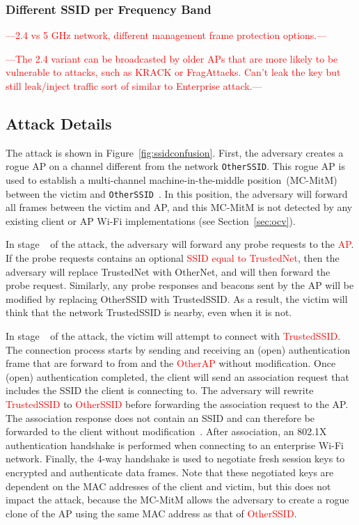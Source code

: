 \documentclass[sigconf,review,anonymous]{acmart}
\newcommand{\circlenum}[1]{\textcircled{\raisebox{-0.90pt}{#1}}}
\newcommand{\wifi}{\mbox{Wi-Fi}}
\newcommand{\fourway}{\mbox{4-way}}
\DeclareRobustCommand{\red}[1]{\textcolor{red}{#1}}
\begin{document}
\subsubsection{Different SSID per Frequency Band}

\red{---2.4 vs 5 GHz network, different management frame protection options.---}

\red{---The 2.4 variant can be broadcasted by older APs that are more likely to be vulnerable to attacks, such as KRACK or FragAttacks. Can't leak the key but still leak/inject traffic sort of similar to Enterprise attack.---}

\subsection{Attack Details}

The attack is shown in Figure~\ref{fig:ssidconfusion}.
First, the adversary creates a rogue AP on a channel different from the network \verb|OtherSSID|.
This rogue AP is used to establish a multi-channel machine-in-the-middle position~(MC-MitM) between the victim and \verb|OtherSSID|~\mbox{\cite{vanhoef2018operating,thankappan2022multi}}.
In this position, the adversary will forward all frames between the victim and AP, and this MC-MitM is not detected by any existing client or AP \wifi{} implementations (see Section~\ref{sec:ocv}).



In stage~\circlenum{1} of the attack, the adversary will forward any probe requests to the \red{AP}.
If the probe requests contains an optional \red{SSID equal to TrustedNet}, then the adversary will replace TrustedNet with OtherNet, and will then forward the probe request.
Similarly, any probe responses and beacons sent by the AP will be modified by replacing OtherSSID with TrustedSSID.
As a result, the victim will think that the network TrustedSSID is nearby, even when it is not.

In stage~\circlenum{2} of the attack, the victim will attempt to connect with \red{TrustedSSID}.
The connection process starts by sending and receiving an (open) authentication frame that are forward to from and the \red{OtherAP} without modification.
Once (open) authentication completed, the client will send an association request that includes the SSID the client is connecting to.
The adversary will rewrite \red{TrustedSSID} to \red{OtherSSID} before forwarding the association request to the AP.
The association response does not contain an SSID and can therefore be forwarded to the client without modification~\mbox{\cite[Table~9-35]{ieee80211-2020}}.
After association, an 802.1X authentication handshake is performed when connecting to an enterprise \wifi{} network.
Finally, the \fourway{} handshake is used to negotiate fresh session keys to encrypted and authenticate data frames.
Note that these negotiated keys are dependent on the MAC addresses of the client and victim, but this does not impact the attack, because the MC-MitM allows the adversary to create a rogue clone of the AP using the same MAC address as that of \red{OtherSSID}.
\end{document}
